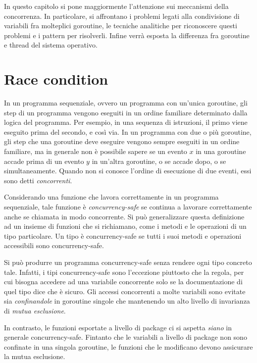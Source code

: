 In questo capitolo si pone maggiormente l'attenzione sui meccanismi della concorrenza.
In particolare, si affrontano i problemi legati alla condivisione di variabili fra molteplici goroutine, le tecniche analitiche per riconoscere questi problemi e i pattern per risolverli.
Infine verrà esposta la differenza fra goroutine e thread del sistema operativo.


\section{Race condition}
\label{sec:race_condition}%
In un programma sequenziale, ovvero un programma con un'unica goroutine, gli step di un programma vengono eseguiti in un ordine familiare determinato dalla logica del programma.
Per esempio, in una sequenza di istruzioni, il primo viene eseguito prima del secondo, e così via.
In un programma con due o più goroutine, gli step che una goroutine deve eseguire vengono sempre eseguiti in un ordine familiare, ma in generale non è possibile sapere se un evento $x$ in una goroutine accade prima di un evento $y$ in un'altra goroutine, o se accade dopo, o se simultaneamente.
Quando non si conosce l'ordine di esecuzione di due eventi, essi sono detti \textit{concorrenti}.

Considerando una funzione che lavora correttamente in un programma sequenziale, tale funzione è \textit{concurrency-safe} se continua a lavorare correttamente anche se chiamata in modo concorrente.
Si può generalizzare questa definizione ad un insieme di funzioni che si richiamano, come i metodi e le operazioni di un tipo particolare.
Un tipo è concurrency-safe se tutti i suoi metodi e operazioni accessibili sono concurrency-safe.

Si può produrre un programma concurrency-safe senza rendere ogni tipo concreto tale.
Infatti, i tipi concurrency-safe sono l'eccezione piuttosto che la regola, per cui bisogna accedere ad una variabile concorrente solo se la documentazione di quel tipo dice che è sicuro.
Gli accessi concorrenti a molte variabili sono evitate sia \textit{confinandole} in goroutine singole che mantenendo un alto livello di invarianza di \textit{mutua esclusione}.

In contrasto, le funzioni esportate a livello di package ci si aspetta \textit{siano} in generale concurrency-safe.
Fintanto che le variabili a livello di package non sono confinate in una singola goroutine, le funzioni che le modificano devono assicurare la mutua esclusione.


